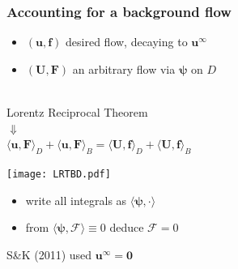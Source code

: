 \documentclass{beamer}
\newcommand{\bm}{\boldsymbol}
\begin{document}
\begin{frame}
\frametitle{Accounting for a background flow}
\begin{center}
\begin{itemize}
 \item $(\bm u,\bm f)$ desired flow, decaying to $\bm u^\infty$
\item $(\bm U,\bm F)$ an arbitrary flow via $\bm \psi$ on $D$
 \end{itemize}
 \ \\
Lorentz Reciprocal Theorem\\
$\Downarrow$\\
$\langle \bm u,\bm F \rangle_D +\langle \bm u,\bm F \rangle_B = \langle \bm U,\bm f \rangle_D +\langle \bm U,\bm f \rangle_B$\\
\begin{minipage}{0.3\linewidth}
\texttt{[image: LRTBD.pdf]} 
\end{minipage}
\begin{minipage}{0.65\linewidth}
\begin{itemize}
\item write all integrals as $\langle\bm \psi, \cdot\rangle$  
\item from $\langle\bm \psi, \mathcal{F}\rangle \equiv 0$ deduce $\mathcal{F} = 0$
\end{itemize} 
\end{minipage}
S\&K (2011) used $\bm u^\infty = \bm 0$
\end{center}
\end{frame}
\end{document}
